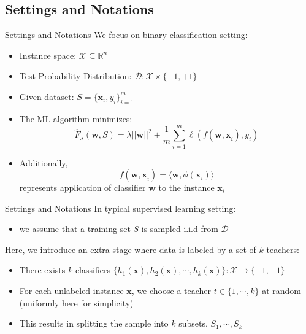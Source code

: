 \documentclass[10pt,table,mathserif]{beamer}
\begin{document}
\subsection{Settings and Notations}

\begin{frame}{Settings and Notations}
  We focus on \alert{binary classification} setting:
  \begin{itemize}
    \item Instance space: $\mathcal{X} \subseteq \mathbb{R}^n $ \pause
    \item Test Probability Distribution: $\mathcal{D}: \mathcal{X} \times \{ -1, +1 \} $ \pause
    \item Given dataset: $S = \{ \mathbf{x}_i, y_i \}^m_{i=1}$ \pause
    \item The ML algorithm minimizes:
      \[\hat{F}_{\lambda}(\mathbf{w}, S) = \lambda || \mathbf{w} ||^2 + \frac{1}{m}\sum^m_{i=1}\ell (f(\mathbf{w, x}_i), y_i)\]
    \item Additionally,
      \[f(\mathbf{w, x}_i) = \langle \mathbf{w}, \phi (\mathbf{x}_i) \rangle\]
      represents application of classifier $\mathbf{w}$ to the instance $\mathbf{x}_i$
  \end{itemize}
\end{frame}

\begin{frame}{Settings and Notations}
  In typical supervised learning setting:
  \begin{itemize}
    \item we assume that a training set $S$ is sampled i.i.d from $\mathcal{D}$ \pause
  \end{itemize}
  Here, we introduce an \alert{extra stage} where data is labeled by a set of \alert{$k$} teachers: \pause
  \begin{itemize}
    \item There exists $k$ classifiers \alert{$\{ h_1(\mathbf{x}), h_2(\mathbf{x}),\cdots, h_k(\mathbf{x}) \} : \mathcal{X} \rightarrow \{ -1, +1\}$} \pause
    \item For each unlabeled instance $\mathbf{x}$, we choose a teacher \alert{$t \in \{1,\cdots,k\}$} at random (uniformly here for simplicity) \pause
    \item This results in splitting the sample into $k$ subsets, \alert{$S_1, \cdots, S_k$}
  \end{itemize}
\end{frame}
\end{document}
